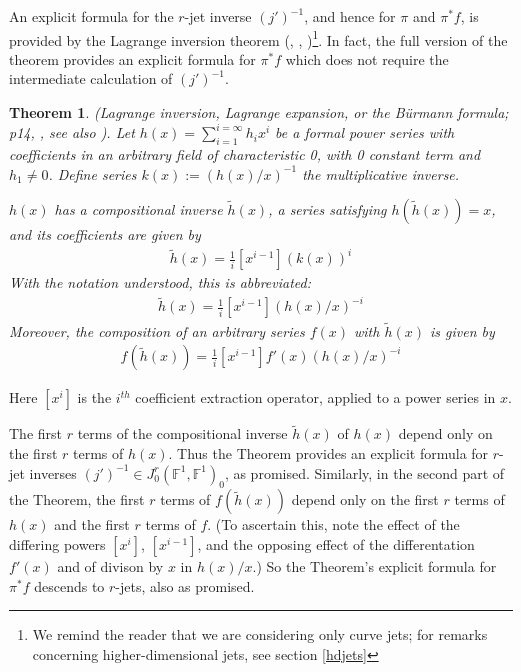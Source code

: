 \documentclass[12pt]{article}
\numberwithin{equation}{section}
\theoremstyle{plain}
\newtheorem{theorem}[definition]{Theorem}
\theoremstyle{definition}
\newcommand{\Fb}{\mathbb{F}}
\begin{document}
An explicit formula for the $r$-jet inverse $(j')^{-1}$, and hence for $\pi$ and $\pi^{*}f$, is provided by the Lagrange inversion theorem (\cite{abramowitzstegun}, \cite{richmond98}, \cite{sokalRidic})\footnote{We remind the reader that we are considering only curve jets; for remarks concerning higher-dimensional jets, see section \ref{hdjets}}. In fact, the full version of the theorem provides an explicit formula for $\pi^{*}f$ which does not require the intermediate calculation of $(j')^{-1}$.

\begin{theorem}\label{laginv} \emph{(Lagrange inversion, Lagrange expansion, or the B\"urmann formula; \cite{abramowitzstegun} p14, \cite{richmond98}, see also \cite{sokalRidic}).} Let $h(x)=\sum_{i=1}^{i=\infty}h_{i}x^{i}$ be a formal power series with coefficients in an arbitrary field of characteristic 0, with 0 constant term and $h_1\neq 0$. Define series $k(x):=\left( h(x)/x\right)^{-1}$ the multiplicative inverse.

$h(x)$ has a compositional inverse $\widetilde{h}(x)$, a series satisfying $h(\widetilde{h}(x))=x$, and its coefficients are given by
\begin{align*}
[x^{i}]\widetilde{h}(x)=\tfrac{1}{i}[x^{i-1}](k(x))^{i}
\end{align*}
With the notation understood, this is abbreviated:
\begin{align*}
[x^{i}]\widetilde{h}(x)=\tfrac{1}{i}[x^{i-1}](h(x)/x)^{-i}
\end{align*}
Moreover, the composition of an arbitrary series $f(x)$ with $\widetilde{h}(x)$ is given by
\begin{align*}
[x^{i}]f(\widetilde{h}(x))=\tfrac{1}{i}[x^{i-1}]f'(x)(h(x)/x)^{-i}
\end{align*}
\end{theorem}

Here $[x^{i}]$ is the $i^{th}$ coefficient extraction operator, applied to a power series in $x$.

The first $r$ terms of the compositional inverse $\widetilde{h}(x)$ of $h(x)$ depend only on the first $r$ terms of $h(x)$. Thus the Theorem provides an explicit formula for $r$-jet inverses $(j')^{-1}\in J^{r}_{0}(\Fb^{1},\Fb^{1})_{0}$, as promised. Similarly, in the second part of the Theorem, the first $r$ terms of $f(\widetilde{h}(x))$ depend only on the first $r$ terms of $h(x)$ and the first $r$ terms of $f$. (To ascertain this, note the effect of the differing powers $[x^{i}]$, $[x^{i-1}]$, and the opposing effect of the differentation $f'(x)$ and of divison by $x$ in $h(x)/x$.) So the Theorem's explicit formula for $\pi^{*}f$ descends to $r$-jets, also as promised.
\end{document}
